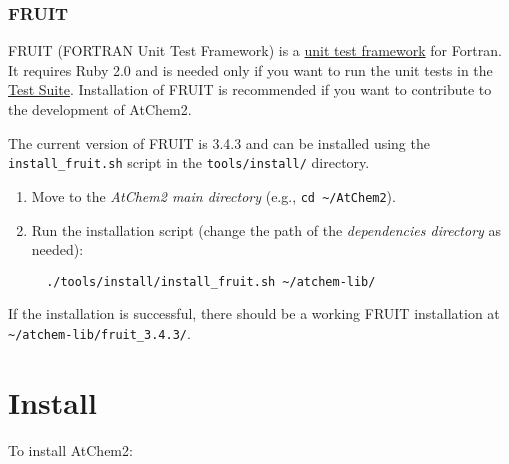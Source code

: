 \subsubsection{FRUIT} \label{fruit}

FRUIT (FORTRAN Unit Test Framework) is a
\href{https://en.wikipedia.org/wiki/Unit_testing}{unit test framework}
for Fortran. It requires Ruby 2.0 and is needed only if you want to
run the unit tests in the \hyperref[sec:testsuite]{Test Suite}.
Installation of FRUIT is recommended if you want to contribute to the
development of AtChem2.

The current version of FRUIT is 3.4.3 and can be installed using the
\texttt{install\_fruit.sh} script in the \texttt{tools/install/}
directory.

\begin{enumerate}
\item Move to the \emph{AtChem2 main directory} (e.g., \texttt{cd\
    \textasciitilde{}/AtChem2}).
\item Run the installation script (change the path of the
  \emph{dependencies directory} as needed):
  \begin{verbatim}
  ./tools/install/install_fruit.sh ~/atchem-lib/
  \end{verbatim}
\end{enumerate}

If the installation is successful, there should be a working FRUIT
installation at
\texttt{\textasciitilde{}/atchem-lib/fruit\_3.4.3/}.

\section{Install} \label{sec:install}

To install AtChem2:

